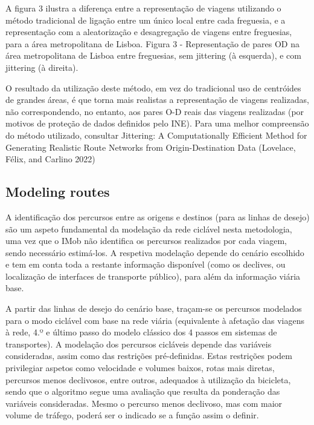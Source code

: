 \documentclass[runningheads]{llncs}
\begin{document}
A figura 3 ilustra a diferença entre a representação de viagens
utilizando o método tradicional de ligação entre um único local entre
cada freguesia, e a representação com a aleatorização e desagregação de
viagens entre freguesias, para a área metropolitana de Lisboa. Figura 3
- Representação de pares OD na área metropolitana de Lisboa entre
freguesias, sem jittering (à esquerda), e com jittering (à direita).

O resultado da utilização deste método, em vez do tradicional uso de
centróides de grandes áreas, é que torna mais realistas a representação
de viagens realizadas, não correspondendo, no entanto, aos pares O-D
reais das viagens realizadas (por motivos de proteção de dados definidos
pelo INE). Para uma melhor compreensão do método utilizado, consultar
Jittering: A Computationally Efficient Method for Generating Realistic
Route Networks from Origin-Destination Data (Lovelace, Félix, and
Carlino 2022)

\hypertarget{modeling-routes}{%
\subsection{Modeling routes}\label{modeling-routes}}

A identificação dos percursos entre as origens e destinos (para as
linhas de desejo) são um aspeto fundamental da modelação da rede
ciclável nesta metodologia, uma vez que o IMob não identifica os
percursos realizados por cada viagem, sendo necessário estimá-los. A
respetiva modelação depende do cenário escolhido e tem em conta toda a
restante informação disponível (como os declives, ou localização de
interfaces de transporte público), para além da informação viária base.

A partir das linhas de desejo do cenário base, traçam-se os percursos
modelados para o modo ciclável com base na rede viária (equivalente à
afetação das viagens à rede, 4.º e último passo do modelo clássico dos 4
passos em sistemas de transportes). A modelação dos percursos cicláveis
depende das variáveis consideradas, assim como das restrições
pré-definidas. Estas restrições podem privilegiar aspetos como
velocidade e volumes baixos, rotas mais diretas, percursos menos
declivosos, entre outros, adequados à utilização da bicicleta, sendo que
o algoritmo segue uma avaliação que resulta da ponderação das variáveis
consideradas. Mesmo o percurso menos declivoso, mas com maior volume de
tráfego, poderá ser o indicado se a função assim o definir.
\end{document}
